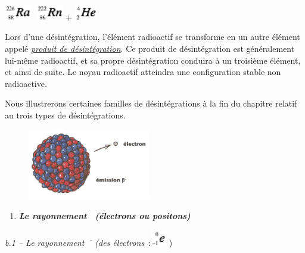 \includegraphics[width=1.177cm,height=0.683cm]{Pictures/100000010000002100000013A43BFC64E9247A2A.png}
\includegraphics[width=1.177cm,height=0.683cm]{Pictures/100000010000002100000013E5BE5263AA80663E.png}
+
\includegraphics[width=0.966cm,height=0.683cm]{Pictures/100000010000001B00000013CE6DE589828DD379.png}

Lors d'une désintégration, l'élément radioactif se transforme en un
autre élément appelé
\href{https://fr.wikipedia.org/wiki/Produit_de_d\%C3\%A9sint\%C3\%A9gration}{\emph{\emph{produit
de désintégration}}}. Ce produit de désintégration est généralement
lui-même radioactif, et sa propre désintégration conduira à un troisième
élément, et ainsi de suite. Le noyau radioactif atteindra une
configuration stable non radioactive.

Nous illustrerons certaines familles de désintégrations à la fin du
chapitre relatif au trois types de désintégrations.

\begin{figure}
\centering
\includegraphics[width=5.373cm,height=3.103cm]{Pictures/10000000000001C2000000FF8E8D24A81F4812A1.jpg}
\caption{}
\end{figure}

\begin{enumerate}
\def\labelenumi{\alph{enumi})}
\tightlist
\item
  \emph{\textbf{Le rayonnement }\textbf{}\textbf{ (électrons ou
  positons) }}
\end{enumerate}

\emph{b.1 -- Le rayonnement }\textsuperscript{\emph{-}}\emph{ (des
électrons~}:\includegraphics[width=0.683cm,height=0.683cm]{Pictures/100000010000001300000013933991303C233C5E.png}
)\emph{ }

